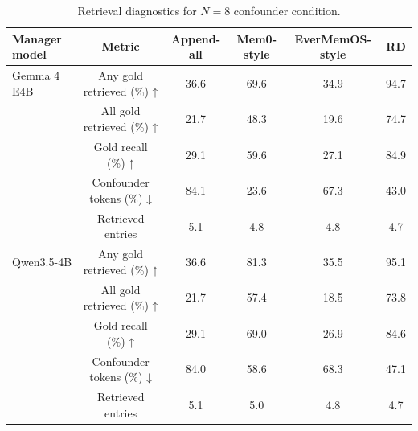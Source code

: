 \begin{table}[ht]
\centering
\caption{Retrieval diagnostics for $N=8$ confounder condition.}
\label{tab:retrieval_diagnostics}
\begin{tabular}{lccccc}
\toprule
Manager model & Metric & Append-all & Mem0-style & EverMemOS-style & RD \\
\midrule
Gemma 4 E4B & Any gold retrieved (\%) ↑ & 36.6 & 69.6 & 34.9 & 94.7 \\
 & All gold retrieved (\%) ↑ & 21.7 & 48.3 & 19.6 & 74.7 \\
 & Gold recall (\%) ↑ & 29.1 & 59.6 & 27.1 & 84.9 \\
 & Confounder tokens (\%) ↓ & 84.1 & 23.6 & 67.3 & 43.0 \\
 & Retrieved entries  & 5.1 & 4.8 & 4.8 & 4.7 \\
\midrule
Qwen3.5-4B & Any gold retrieved (\%) ↑ & 36.6 & 81.3 & 35.5 & 95.1 \\
 & All gold retrieved (\%) ↑ & 21.7 & 57.4 & 18.5 & 73.8 \\
 & Gold recall (\%) ↑ & 29.1 & 69.0 & 26.9 & 84.6 \\
 & Confounder tokens (\%) ↓ & 84.0 & 58.6 & 68.3 & 47.1 \\
 & Retrieved entries  & 5.1 & 5.0 & 4.8 & 4.7 \\
\bottomrule
\end{tabular}
\end{table}